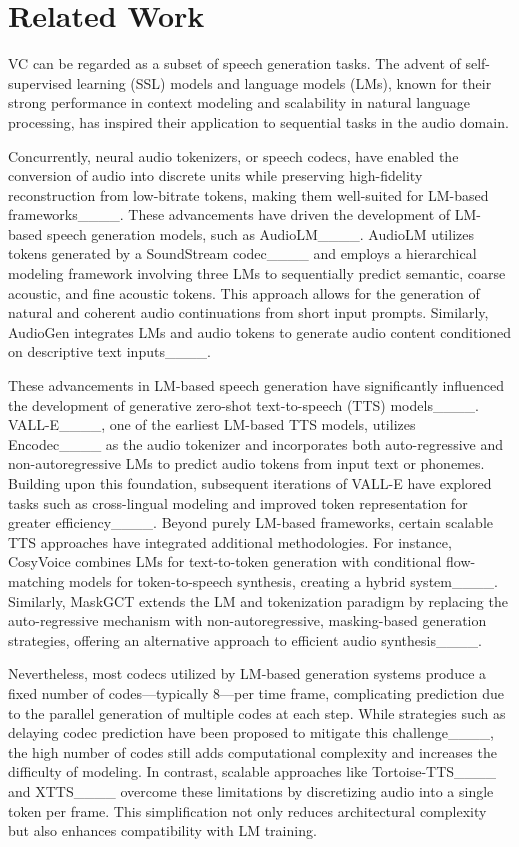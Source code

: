 \section{Related Work}
\label{sec:related_works}
VC can be regarded as a subset of speech generation tasks. The advent of self-supervised learning (SSL) models and language models (LMs), known for their strong performance in context modeling and scalability in natural language processing, has inspired their application to sequential tasks in the audio domain.

Concurrently, neural audio tokenizers, or speech codecs, have enabled the conversion of audio into discrete units while preserving high-fidelity reconstruction from low-bitrate tokens, making them well-suited for LM-based frameworks____. These advancements have driven the development of LM-based speech generation models, such as AudioLM____. AudioLM utilizes tokens generated by a SoundStream codec____ and employs a hierarchical modeling framework involving three LMs to sequentially predict semantic, coarse acoustic, and fine acoustic tokens. This approach allows for the generation of natural and coherent audio continuations from short input prompts. Similarly, AudioGen integrates LMs and audio tokens to generate audio content conditioned on descriptive text inputs____.

These advancements in LM-based speech generation have significantly influenced the development of generative zero-shot text-to-speech (TTS) models____. VALL-E____, one of the earliest LM-based TTS models, utilizes Encodec____ as the audio tokenizer and incorporates both auto-regressive and non-autoregressive LMs to predict audio tokens from input text or phonemes. Building upon this foundation, subsequent iterations of VALL-E have explored tasks such as cross-lingual modeling and improved token representation for greater efficiency____. Beyond purely LM-based frameworks, certain scalable TTS approaches have integrated additional methodologies. For instance, CosyVoice combines LMs for text-to-token generation with conditional flow-matching models for token-to-speech synthesis, creating a hybrid system____. Similarly, MaskGCT extends the LM and tokenization paradigm by replacing the auto-regressive mechanism with non-autoregressive, masking-based generation strategies, offering an alternative approach to efficient audio synthesis____.

Nevertheless, most codecs utilized by LM-based generation systems produce a fixed number of codes—typically 8—per time frame, complicating prediction due to the parallel generation of multiple codes at each step. While strategies such as delaying codec prediction have been proposed to mitigate this challenge____, the high number of codes still adds computational complexity and increases the difficulty of modeling. In contrast, scalable approaches like Tortoise-TTS____ and XTTS____ overcome these limitations by discretizing audio into a single token per frame. This simplification not only reduces architectural complexity but also enhances compatibility with LM training.

